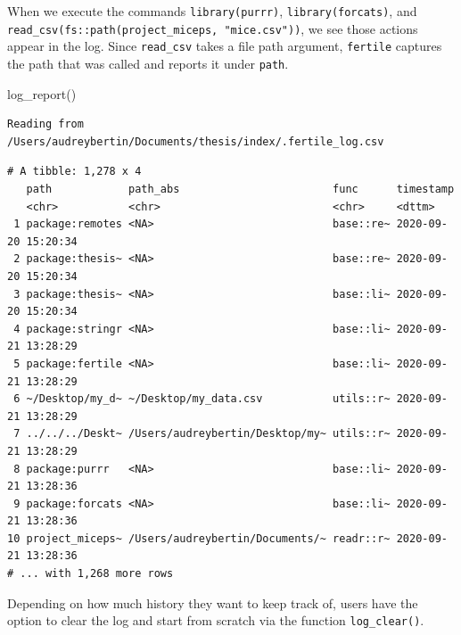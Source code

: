 \documentclass[12pt,twoside]{reedthesis}
\newenvironment{Shaded}{\begin{snugshade}}{\end{snugshade}}
\newcommand{\FunctionTok}[1]{\textcolor[rgb]{0.00,0.00,0.00}{#1}}
\newcommand{\NormalTok}[1]{#1}
\begin{document}
When we execute the commands \texttt{library(purrr)}, \texttt{library(forcats)}, and \texttt{read\_csv(fs::path(\textquotesingle{}project\_miceps\textquotesingle{},\ "mice.csv"))}, we see those actions appear in the log. Since \texttt{read\_csv} takes a file path argument, \texttt{fertile} captures the path that was called and reports it under \texttt{path}.
\begin{Shaded}
\begin{Highlighting}[]
\FunctionTok{log\_report}\NormalTok{()}
\end{Highlighting}
\end{Shaded}
\footnotesize
\begin{verbatim}
Reading from /Users/audreybertin/Documents/thesis/index/.fertile_log.csv
\end{verbatim}
\begin{verbatim}
# A tibble: 1,278 x 4
   path            path_abs                        func      timestamp          
   <chr>           <chr>                           <chr>     <dttm>             
 1 package:remotes <NA>                            base::re~ 2020-09-20 15:20:34
 2 package:thesis~ <NA>                            base::re~ 2020-09-20 15:20:34
 3 package:thesis~ <NA>                            base::li~ 2020-09-20 15:20:34
 4 package:stringr <NA>                            base::li~ 2020-09-21 13:28:29
 5 package:fertile <NA>                            base::li~ 2020-09-21 13:28:29
 6 ~/Desktop/my_d~ ~/Desktop/my_data.csv           utils::r~ 2020-09-21 13:28:29
 7 ../../../Deskt~ /Users/audreybertin/Desktop/my~ utils::r~ 2020-09-21 13:28:29
 8 package:purrr   <NA>                            base::li~ 2020-09-21 13:28:36
 9 package:forcats <NA>                            base::li~ 2020-09-21 13:28:36
10 project_miceps~ /Users/audreybertin/Documents/~ readr::r~ 2020-09-21 13:28:36
# ... with 1,268 more rows
\end{verbatim}
\normalsize

Depending on how much history they want to keep track of, users have the option to clear the log and start from scratch via the function \texttt{log\_clear()}.
\end{document}
